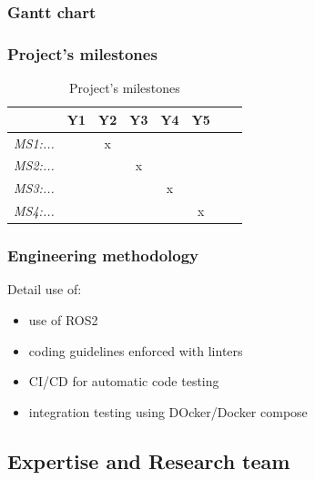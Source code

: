 \subsubsection{Gantt chart}

\begin{figure}[!ht]
\resizebox{\linewidth}{!}{
    
}
\end{figure}


\subsubsection{Project's milestones}

\begin{table}[h!]
    \centering
\begin{tabular}{@{}lccccccr@{}}
\toprule
\textit{\textbf{}}              & \textbf{Y1} & \textbf{Y2} & \textbf{Y3} & \textbf{Y4} & \textbf{Y5} \\ \midrule
\textit{MS1:...} &   & x  &    &   &    &  &   \\ 
\textit{MS2:...} &   &    & x  &   &    &  &   \\ 
\textit{MS3:...} &   &    &    & x &    &  &   \\ 
\textit{MS4:...} &   &    &    &   & x  &  &   \\ \bottomrule
\end{tabular}
    \caption{Project's milestones}
    \label{milestones}
\end{table}

\subsubsection{Engineering methodology}


Detail use of:
\begin{itemize}
    \item use of ROS2
    \item coding guidelines enforced with linters
    \item CI/CD for automatic code testing
    \item integration testing using DOcker/Docker compose
\end{itemize}

\subsection{Expertise and Research team}
\label{research-team}


